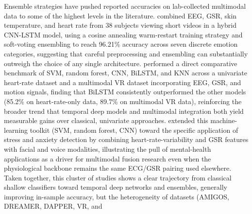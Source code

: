 Ensemble strategies have pushed reported accuracies on lab-collected multimodal data to some of the highest levels in the literature. \cite{liao2025emotion} combined EEG, GSR, skin temperature, and heart rate from 38 subjects viewing short videos in a hybrid CNN-LSTM model, using a cosine annealing warm-restart training strategy and soft-voting ensembling to reach 96.21\% accuracy across seven discrete emotion categories, suggesting that careful preprocessing and ensembling can substantially outweigh the choice of any single architecture. \cite{anon2025performance} performed a direct comparative benchmark of SVM, random forest, CNN, BiLSTM, and KNN across a univariate heart-rate dataset and a multimodal VR dataset incorporating EEG, GSR, and motion signals, finding that BiLSTM consistently outperformed the other models (85.2\% on heart-rate-only data, 89.7\% on multimodal VR data), reinforcing the broader trend that temporal deep models and multimodal integration both yield measurable gains over classical, univariate approaches. \cite{kumar2025emotions} extended this machine-learning toolkit (SVM, random forest, CNN) toward the specific application of stress and anxiety detection by combining heart-rate-variability and GSR features with facial and voice modalities, illustrating the pull of mental-health applications as a driver for multimodal fusion research even when the physiological backbone remains the same ECG/GSR pairing used elsewhere. Taken together, this cluster of studies shows a clear trajectory from classical shallow classifiers toward temporal deep networks and ensembles, generally improving in-sample accuracy, but the heterogeneity of datasets (AMIGOS, DREAMER, DAPPER, VR, and

